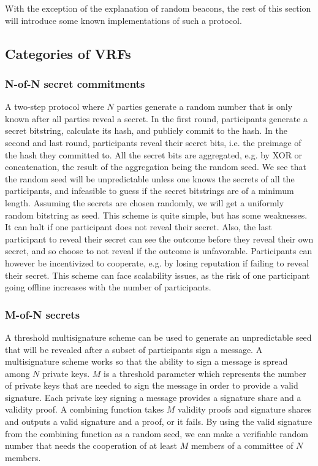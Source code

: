 With the exception of the explanation of random beacons, the rest of this section will introduce some known implementations of such a protocol.

\subsection{Categories of VRFs}

\subsubsection{N-of-N secret commitments}
A two-step protocol where $N$ parties generate a random number that is only known after all parties reveal a secret.
In the first round, participants generate a secret bitstring, calculate its hash, and publicly commit to the hash. In the second and last round, participants reveal their secret bits, i.e. the preimage of the hash they committed to. All the secret bits are aggregated, e.g. by XOR or concatenation, the result of the aggregation being the random seed. We see that the random seed will be unpredictable unless one knows the secrets of all the participants, and infeasible to guess if the secret bitstrings are of a minimum length. Assuming the secrets are chosen randomly, we will get a uniformly random bitstring as seed.
This scheme is quite simple, but has some weaknesses. It can halt if one participant does not reveal their secret. Also, the last participant to reveal their secret can see the outcome before they reveal their own secret, and so choose to not reveal if the outcome is unfavorable. Participants can however be incentivized to cooperate, e.g. by losing reputation if failing to reveal their secret. This scheme can face scalability issues, as the risk of one participant going offline increases with the number of participants.

\subsubsection{M-of-N secrets}
A threshold multisignature scheme can be used to generate an unpredictable seed that will be revealed after a subset of participants sign a message.
A multisignature scheme works so that the ability to sign a message is spread among $N$ private keys. $M$ is a threshold parameter which represents the number of private keys that are needed to sign the message in order to provide a valid signature. Each private key signing a message provides a signature share and a validity proof. A combining function takes $M$ validity proofs and signature shares and outputs a valid signature and a proof, or it fails. By using the valid signature from the combining function as a random seed, we can make a verifiable random number that needs the cooperation of at least $M$ members of a committee of $N$ members.  

